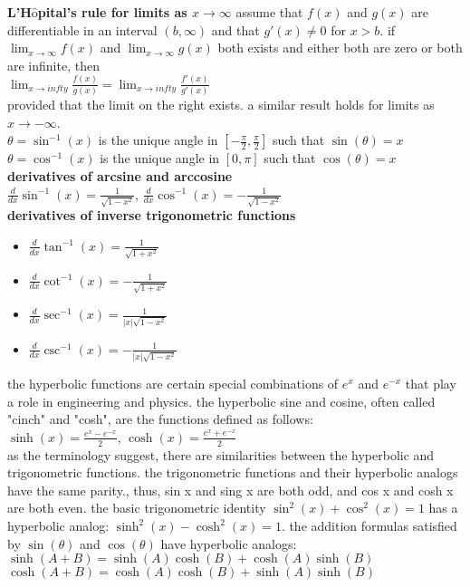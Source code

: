 \documentclass{article}
\begin{document}
\textbf{L'H$\hat{\text{o}}$pital's rule for limits as $x \to \infty$} assume that $f(x)$ and $g(x)$ are differentiable in an interval $(b, \infty)$ and that $g'(x) \neq 0$ for $x > b$. if $\lim_{x \to \infty}f(x)$ and $\lim_{x \to \infty}g(x)$ both exists and either both are zero or both are infinite, then\\ $\lim_{x \to infty}\frac{f(x)}{g(x)} = \lim_{x \to infty}\frac{f'(x)}{g'(x)}$\\ provided that the limit on the right exists. a similar result holds for limits as $x \to -\infty$.\\

$\theta = \sin^{-1}(x)$ is the unique angle in $[-\frac{\pi}{2}, \frac{\pi}{2}]$ such that $\sin(\theta) = x$\\
$\theta = \cos^{-1}(x)$ is the unique angle in $[0, \pi]$ such that $\cos(\theta) = x$\\

\textbf{derivatives of arcsine and arccosine}\\
$\frac{d}{dx}\sin^{-1}(x) = \frac{1}{\sqrt{1 - x^2}}$, $\frac{d}{dx}\cos^{-1}(x) = -\frac{1}{\sqrt{1 - x^2}}$\\  

\textbf{derivatives of inverse trigonometric functions}\\
	\begin{itemize}
		\item $\frac{d}{dx}\tan^{-1}(x) = \frac{1}{\sqrt{1 + x^2}}$ 
		\item $\frac{d}{dx}\cot^{-1}(x) = -\frac{1}{\sqrt{1 + x^2}}$ 
		\item $\frac{d}{dx}\sec^{-1}(x) = \frac{1}{\lvert x\rvert\sqrt{1 - x^2}}$ 
		\item $\frac{d}{dx}\csc^{-1}(x) = -\frac{1}{\lvert x\rvert\sqrt{1 - x^2}}$ 
	\end{itemize}

the hyperbolic functions are certain special combinations of $e^x$ and $e^{-x}$ that play a role in engineering and physics. the hyperbolic sine and cosine, often called "cinch" and "cosh", are the functions defined as follows:\\
$\sinh(x) = \frac{e^x - e^{-x}}{2}$, $\cosh(x) = \frac{e^x + e^{-x}}{2}$\\ as the terminology suggest, there are similarities between the hyperbolic and trigonometric functions. the trigonometric functions and their hyperbolic analogs have the same parity., thus, sin x and sing x are both odd, and cos x and cosh x are both even. the basic trigonometric identity $\sin^2(x) + \cos^2(x) = 1$ has a hyperbolic analog: $\sinh^2(x) - \cosh^2(x) = 1$. the addition formulas satisfied by $\sin(\theta)$ and $\cos(\theta)$ have hyperbolic analogs:\\
$\sinh(A + B) = \sinh(A)\cosh(B) + \cosh(A)\sinh(B)$\\
$\cosh(A + B) = \cosh(A)\cosh(B) + \sinh(A)\sinh(B)$\\		
\end{document}
